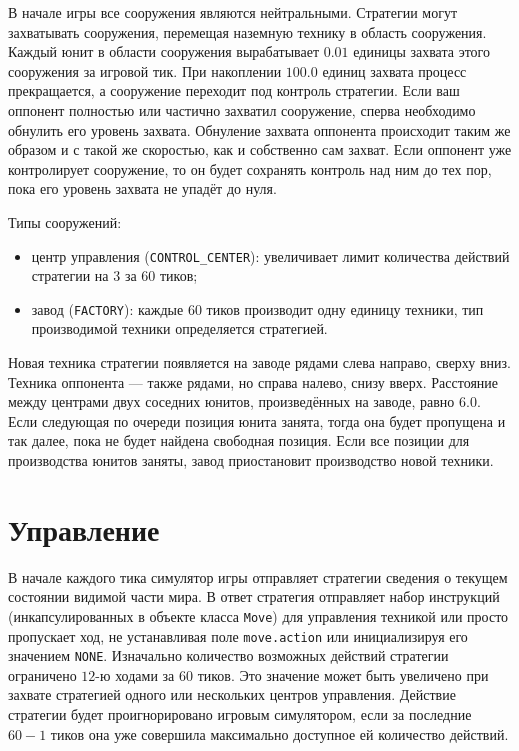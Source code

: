В начале игры все сооружения являются нейтральными. Стратегии могут захватывать сооружения, перемещая наземную технику в область сооружения.
Каждый юнит в области сооружения вырабатывает $0.01$ единицы захвата этого сооружения за игровой тик. При накоплении $100.0$ единиц захвата
процесс прекращается, а сооружение переходит под контроль стратегии. Если ваш оппонент полностью или частично захватил сооружение, сперва
необходимо обнулить его уровень захвата. Обнуление захвата оппонента происходит таким же образом и с такой же скоростью, как и собственно
сам захват. Если оппонент уже контролирует сооружение, то он будет сохранять контроль над ним до тех пор, пока его уровень захвата не упадёт
до нуля.

Типы сооружений:
\begin{itemize}
    \item центр управления (\texttt{CONTROL\_CENTER}): увеличивает лимит количества действий стратегии на $3$ за $60$ тиков;
    \item завод (\texttt{FACTORY}): каждые $60$ тиков производит одну единицу техники, тип производимой техники определяется стратегией.
\end{itemize}

Новая техника стратегии появляется на заводе рядами слева направо, сверху вниз. Техника оппонента --- также рядами, но справа налево, снизу
вверх. Расстояние между центрами двух соседних юнитов, произведённых на заводе, равно $6.0$. Если следующая по очереди позиция юнита занята,
тогда она будет пропущена и так далее, пока не будет найдена свободная позиция. Если все позиции для производства юнитов заняты, завод
приостановит производство новой техники.

\section{Управление}

В начале каждого тика симулятор игры отправляет стратегии сведения о текущем состоянии видимой части мира. В ответ стратегия отправляет
набор инструкций (инкапсулированных в объекте класса \texttt{Move}) для управления техникой или просто пропускает ход, не устанавливая поле
\texttt{move.action} или инициализируя его значением \texttt{NONE}. Изначально количество возможных действий стратегии ограничено $12$-ю
ходами за $60$ тиков. Это значение может быть увеличено при захвате стратегией одного или нескольких центров управления. Действие стратегии
будет проигнорировано игровым симулятором, если за последние $60 - 1$ тиков она уже совершила максимально доступное ей количество действий.

